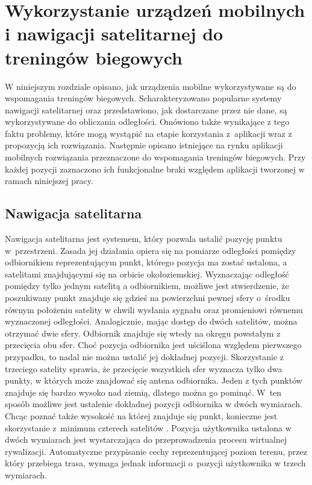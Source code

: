 \chapter{Wykorzystanie urządzeń mobilnych i nawigacji satelitarnej do treningów biegowych}\label{chap:wykorzystanie_urzadzen_mobilnych}
W niniejszym rozdziale opisano, jak urządzenia mobilne wykorzystywane są do wspomagania treningów biegowych. Scharakteryzowano popularne systemy nawigacji satelitarnej oraz przedstawiono, jak dostarczane przez nie dane, są wykorzystywane do obliczania odległości. Omówiono także wynikające z tego faktu problemy, które mogą wystąpić na etapie korzystania z~aplikacji wraz z propozycją ich rozwiązania. Następnie opisano istniejące na rynku aplikacji mobilnych rozwiązania przeznaczone do wspomagania treningów biegowych. Przy każdej pozycji zaznaczono ich funkcjonalne braki względem aplikacji tworzonej w ramach niniejszej pracy.
\section{Nawigacja satelitarna}\label{section:nawigacja-satelitarna}
Nawigacja satelitarna jest systemem, który pozwala ustalić pozycję punktu w~przestrzeni. Zasada jej działania opiera się na pomiarze odległości pomiędzy odbiornikiem reprezentującym punkt, którego pozycja ma zostać ustalona, a satelitami znajdującymi się na orbicie okołoziemskiej. Wyznaczając odległość pomiędzy tylko jednym satelitą a odbiornikiem, możliwe jest stwierdzenie, że poszukiwany punkt znajduje się gdzieś na powierzchni pewnej sfery o~środku równym położeniu satelity w chwili wysłania sygnału oraz promieniowi równemu wyznaczonej odległości. Analogicznie, mając dostęp do dwóch satelitów, można otrzymać dwie sfery. Odbiornik znajduje się wtedy na okręgu powstałym z przecięcia obu sfer. Choć pozycja odbiornika jest uściślona względem pierwszego przypadku, to nadal nie można ustalić jej dokładnej pozycji. Skorzystanie z trzeciego satelity sprawia, że przecięcie wszystkich sfer wyznacza tylko dwa punkty, w których może znajdować się antena odbiornika. Jeden z tych punktów znajduje się bardzo wysoko nad ziemią, dlatego można go pominąć. W~ten sposób możliwe jest ustalenie dokładnej pozycji odbiornika w dwóch wymiarach. Chcąc poznać także wysokość na której znajduje się punkt, konieczne jest skorzystanie z~minimum czterech satelitów  \cite{gps2}. Pozycja użytkownika ustalona w dwóch wymiarach jest wystarczająca do przeprowadzenia procesu wirtualnej rywalizacji. Automatyczne przypisanie cechy reprezentującej poziom terenu, przez który przebiega trasa, wymaga jednak informacji o~pozycji użytkownika w trzech wymiarach.

